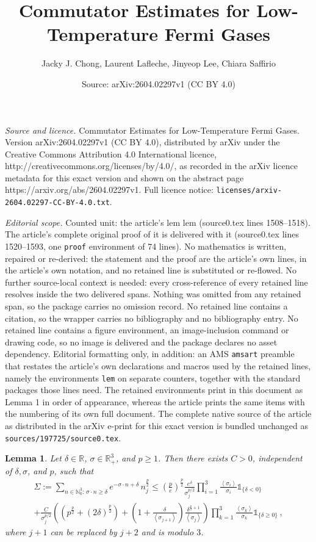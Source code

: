 \documentclass[10pt,a4paper]{amsart}
\title{Commutator Estimates for Low-Temperature Fermi Gases}
\author{Jacky J. Chong, Laurent Lafleche, Jinyeop Lee, Chiara Saffirio}
\date{Source: arXiv:2604.02297v1 (CC BY 4.0)}
\newtheorem{lem}{Lemma}
\newcommand		{\N}		{\mathbb N}			%
\newcommand		{\R}		{\RR}
\newcommand		{\RR}		{\mathbb R}			%
\newcommand		{\bangle}[1]	{\lt\langle #1\rt\rangle}
\newcommand		{\indic}	{\mathds{1}}		%
\newcommand		{\lt}			{\left}				%
\newcommand		{\rt}			{\right}			%
\newcommand		{\weight}[1]	{\bangle{#1}}	%
\begin{document}
\maketitle

\noindent\emph{Source and licence.} Commutator Estimates for Low-Temperature Fermi Gases. Version arXiv:2604.02297v1 (CC BY 4.0), distributed by arXiv under the Creative Commons Attribution 4.0 International licence, http://creativecommons.org/licenses/by/4.0/, as recorded in the arXiv licence metadata for this exact version and shown on the abstract page https://arxiv.org/abs/2604.02297v1. Full licence notice: \texttt{licenses/arxiv-2604.02297-CC-BY-4.0.txt}.\par\smallskip

\noindent\textit{Editorial scope.} Counted unit: the article's lem lem (source0.tex lines 1508--1518). The article's complete original proof of it is delivered with it (source0.tex lines 1520--1593, one \texttt{proof} environment of 74 lines). No mathematics is written, repaired or re-derived: the statement and the proof are the article's own lines, in the article's own notation, and no retained line is substituted or re-flowed.  No further source-local context is needed: every cross-reference of every retained line resolves inside the two delivered spans.  Nothing was omitted from any retained span, so the package carries no omission record.  No retained line contains a citation, so the wrapper carries no bibliography and no bibliography entry.  No retained line contains a figure environment, an image-inclusion command or drawing code, so no image is delivered and the package declares no asset dependency.  Editorial formatting only, in addition: an AMS \texttt{amsart} preamble that restates the article's own declarations and macros used by the retained lines, namely the environments \texttt{lem} on separate counters, together with the standard packages those lines need.  The retained environments print in this document as Lemma 1 in order of appearance, whereas the article prints the same items with the numbering of its own full document.  The complete native source of the article as distributed in the arXiv e-print for this exact version is bundled unchanged as \texttt{sources/197725/source0.tex}.
	\begin{lem}
		Let $\delta\in\R$, $\sigma\in\R_+^3$, and $p\geq 1$. Then there exists $C>0$, independent of $\delta, \sigma$, and $p$, such that 
		\begin{multline*}
			\Sigma:=\sum_{n\in\N_0^3:\, \sigma\cdot n \geq \delta} e^{-\sigma\cdot n +\delta}\, n_j^\frac{p}{2} \le \lt(\frac{p}{e}\rt)^{\frac{p}{2}}\frac{e^\delta}{\sigma_j^{p/2}} \prod^3_{i=1} \frac{\weight{\sigma_i}}{\sigma_i}\indic_{\{\delta< 0\}}
            \\
            + \frac{C}{\sigma_j^{p/2}}
			\lt(\lt( p^\frac{p}{2} + \lt(2\delta\rt)^\frac{p}{2} \rt)
			+ \lt(1+\frac{\delta}{\weight{\sigma_{j+1}}}\rt) \frac{\delta^{\frac{p}{2}+1}}{\weight{\sigma_j}} \rt) \prod_{k=1}^3 \frac{\weight{\sigma_k}}{\sigma_k}\indic_{\{\delta\ge 0\}}\,,
		\end{multline*}
		where $j+1$ can be replaced by $j+2$ and is modulo $3$.
	\end{lem}
\end{document}
